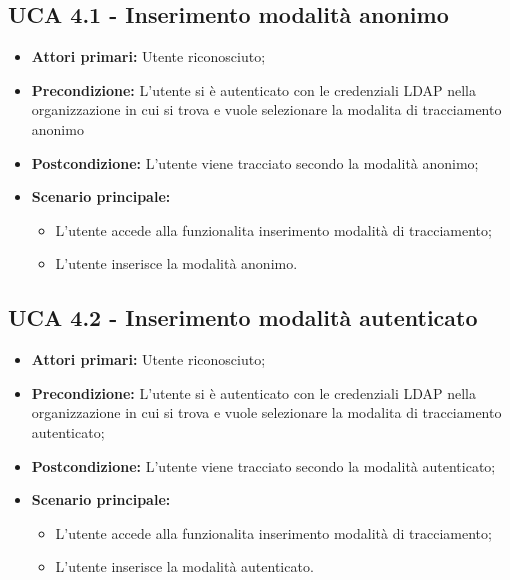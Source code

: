 \subsection{UCA 4.1 - Inserimento modalità anonimo}%
\begin{itemize}
\item \textbf{Attori primari:} Utente riconosciuto;
\item \textbf{Precondizione:} L'utente si è autenticato con le credenziali LDAP nella organizzazione in cui si trova e vuole selezionare la modalita di tracciamento anonimo
\item \textbf{Postcondizione:}  L'utente viene tracciato secondo la modalità anonimo;
\item \textbf{Scenario principale:}
	\begin{itemize}
	\item L'utente accede alla funzionalita inserimento modalità di tracciamento;
	\item L'utente inserisce la modalità anonimo.
\end{itemize}
\end{itemize}

\subsection{UCA 4.2 - Inserimento modalità autenticato}%
\begin{itemize}
	\item \textbf{Attori primari:} Utente riconosciuto;
	\item \textbf{Precondizione:} L'utente si è autenticato con le credenziali LDAP nella organizzazione in cui si trova e vuole selezionare la modalita di tracciamento autenticato;
	\item \textbf{Postcondizione:}  L'utente viene tracciato secondo la modalità autenticato;
	\item \textbf{Scenario principale:}
	\begin{itemize}
		\item L'utente accede alla funzionalita inserimento modalità di tracciamento;
		\item L'utente inserisce la modalità autenticato.
	\end{itemize}
\end{itemize}
